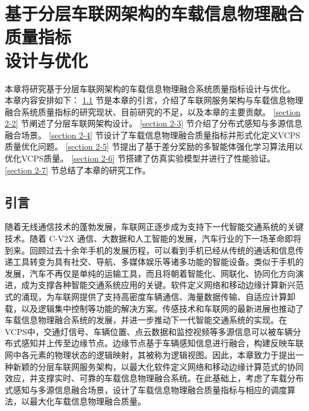 \chapter[基于分层车联网架构的车载信息物理融合质量指标设计与优化]{基于分层车联网架构的车载信息物理融合质量指标\\设计与优化}
\removelofgap
\removelotgap
本章将研究基于分层车联网架构的车载信息物理融合系统质量指标设计与优化。
本章内容安排如下：
\ref{section 2-1} 节是本章的引言，介绍了车联网服务架构与车载信息物理融合系统质量指标的研究现状、目前研究的不足，以及本章的主要贡献。
\ref{section 2-2} 节阐述了分层车联网架构设计。
\ref{section 2-3} 节介绍了分布式感知与多源信息融合场景。
\ref{section 2-4} 节设计了车载信息物理融合质量指标并形式化定义VCPS质量优化问题。
\ref{section 2-5} 节提出了基于差分奖励的多智能体强化学习算法用以优化VCPS质量。
\ref{section 2-6} 节搭建了仿真实验模型并进行了性能验证。
\ref{section 2-7} 节总结了本章的研究工作。

\section{引言}\label{section 2-1}

随着无线通信技术的蓬勃发展，车联网正逐步成为支持下一代智能交通系统的关键技术。随着 C-V2X 通信、大数据和人工智能的发展，汽车行业的下一场革命即将到来。回顾过去十余年手机的发展历程，可以看到手机已经从传统的通话和信息传递工具转变为具有社交、导航、多媒体娱乐等诸多功能的智能设备。类似于手机的发展，汽车不再仅是单纯的运输工具，而且将朝着智能化、网联化、协同化方向演进，成为支撑各种智能交通系统应用的关键。软件定义网络\cite{li2021zhi}和移动边缘计算\cite{liu2022fedcpf}新兴范式的涌现，为车联网提供了支持高密度车辆通信、海量数据传输、自适应计算卸载，以及逻辑集中控制等功能的解决方案。传感技术和车联网的最新进展也推动了车载信息物理融合系统的发展，并进一步推动下一代智能交通系统的实现。在VCPS中，交通灯信号、车辆位置、点云数据和监控视频等多源信息可以被车辆分布式感知并上传至边缘节点。边缘节点基于车辆感知信息进行融合，构建反映车联网中各元素的物理状态的逻辑映射，其被称为逻辑视图。因此，本章致力于提出一种新颖的分层车联网服务架构，以最大化软件定义网络和移动边缘计算范式的协同效应，并支撑实时、可靠的车载信息物理融合系统。在此基础上，考虑了车载分布式感知与多源信息融合场景，设计了车载信息物理融合质量指标与相应的调度算法，以最大化车载信息物理融合质量。

